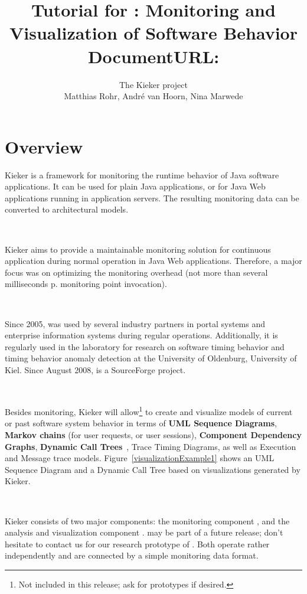 \documentclass[a4paper,12pt]{scrartcl}
\title{Tutorial for \kieker{}: Monitoring and Visualization of Software Behavior \\ \small \vspace{3mm} DocumentURL: \kiekertutorialurl{}}
\author{The Kieker project \\ Matthias Rohr, Andr\'{e} van Hoorn, Nina Marwede}
\begin{document}
\maketitle
\tableofcontents
\section{Overview}


Kieker is a framework for monitoring the runtime behavior of Java software applications. It can be used for plain Java applications, or for Java Web applications running in application servers. The resulting monitoring data can be converted to architectural models.

\

Kieker aims to provide a maintainable monitoring solution for continuous application during normal operation in Java Web applications. Therefore, a major focus was on optimizing the monitoring overhead (not more than several milliseconds p. monitoring point invocation).

\

Since 2005, \tpmon{} was used by several industry partners in portal systems and enterprise information systems during regular operations. Additionally, it is regularly used in the laboratory for research on software timing behavior and timing behavior anomaly detection at the University of Oldenburg, University of Kiel. Since August 2008, \tpmon{} is a SourceForge project.

\

Besides monitoring, Kieker will allow\footnote{Not included in this release; ask for prototypes if desired.} to create and visualize models of current or past software system behavior in terms of \textbf{UML Sequence Diagrams}, \textbf{Markov chains} (for user requests, or user sessions), \textbf{Component Dependency Graphs}, \textbf{Dynamic Call Trees}~\citep{AmmonsBallLarus97ExploitingHardwarePerformanceCountersWithFlowAndContextSensitiveProfiling}, Trace Timing Diagrams, as well as Execution and Message trace models. Figure~\ref{visualizationExample1} shows an UML Sequence Diagram and a Dynamic Call Tree based on visualizations generated by Kieker.

\

Kieker consists of two major components: the monitoring component \textbf{\tpmon{}}, and the analysis and visualization component \textbf{\tpan{}}. \tpan{} may be part of a future release; don't hesitate to contact us for our research prototype of \tpan{}. Both operate rather independently and are connected by a simple monitoring data format. %
\end{document}
